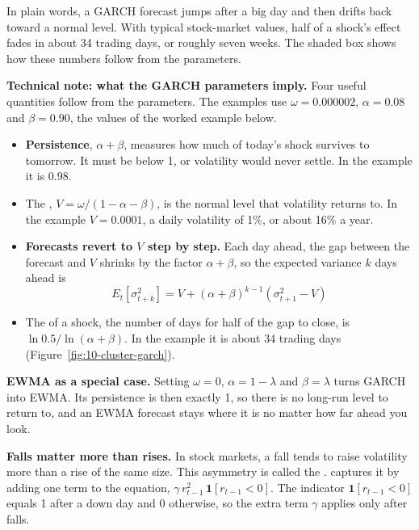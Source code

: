 In plain words, a GARCH forecast jumps after a big day and then drifts back toward a normal level. With typical stock-market values, half of a shock's effect fades in about 34 trading days, or roughly seven weeks. The shaded box shows how these numbers follow from the parameters.

\begin{technote}
\textbf{Technical note: what the GARCH parameters imply.} Four useful quantities follow from the parameters. The examples use $\omega = 0.000002$, $\alpha = 0.08$ and $\beta = 0.90$, the values of the worked example below.
\begin{itemize}
  \item \textbf{Persistence}, $\alpha + \beta$, measures how much of today's shock survives to tomorrow. It must be below 1, or volatility would never settle. In the example it is 0.98.
  \item The , $V = \omega / (1 - \alpha - \beta)$, is the normal level that volatility returns to. In the example $V = 0.0001$, a daily volatility of 1\%, or about 16\% a year.
  \item \textbf{Forecasts revert to $V$ step by step.} Each day ahead, the gap between the forecast and $V$ shrinks by the factor $\alpha + \beta$, so the expected variance $k$ days ahead is
  \begin{equation}
    E_t[\sigma^2_{t+k}] = V + (\alpha + \beta)^{k-1}\left(\sigma^2_{t+1} - V\right)
    \label{eq:10-forecast}
  \end{equation}
  \item The  of a shock, the number of days for half of the gap to close, is $\ln 0.5 / \ln(\alpha + \beta)$. In the example it is about 34 trading days (Figure~\ref{fig:10-cluster-garch}).
\end{itemize}

\textbf{EWMA as a special case.} Setting $\omega = 0$, $\alpha = 1 - \lambda$ and $\beta = \lambda$ turns GARCH into EWMA. Its persistence is then exactly 1, so there is no long-run level to return to, and an EWMA forecast stays where it is no matter how far ahead you look.
\end{technote}

\textbf{Falls matter more than rises.} In stock markets, a fall tends to raise volatility more than a rise of the same size. This asymmetry is called the .  captures it by adding one term to the equation, $\gamma\,r^2_{t-1}\,\mathbf{1}[r_{t-1} < 0]$. The indicator $\mathbf{1}[r_{t-1} < 0]$ equals 1 after a down day and 0 otherwise, so the extra term $\gamma$ applies only after falls.

